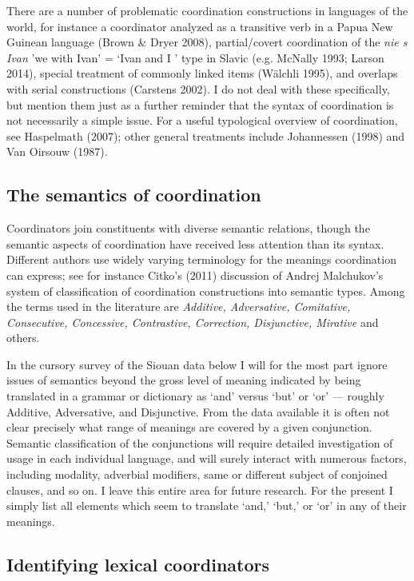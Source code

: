 \documentclass[output=paper]{LSP/langsci}
\begin{document}
There are a number of problematic coordination constructions in languages of the world, for instance a coordinator analyzed as a transitive verb in a Papua New Guinean language (Brown \& Dryer 2008),  partial/covert coordination of the \textit{nie s Ivan} 'we with Ivan' = `Ivan and I ' type in Slavic (e.g. McNally 1993; Larson 2014), special treatment of commonly linked items (W\"alchli 1995), and overlaps with serial constructions (Carstens 2002). I do not deal with these specifically, but mention them just as a further reminder that the syntax of coordination is not necessarily a simple issue. For a useful typological overview of coordination, see Haspelmath (2007); other general treatments include Johannessen (1998) and Van Oirsouw (1987). 

\subsection{The semantics of coordination}

Coordinators join constituents with diverse semantic relations, though the semantic aspects of coordination have received less attention than its syntax. Different authors use widely varying terminology for the meanings coordination can express; see for instance Citko's (2011) discussion of Andrej Malchukov's system of classification of coordination constructions into semantic types. Among the terms used in the literature are \textit{Additive, Adversative, Comitative, Consecutive, Concessive, Contrastive, Correction, Disjunctive, Mirative} and others.

In the cursory survey of the Siouan data below I will for the most part ignore issues of semantics beyond the gross level of meaning indicated by being translated in a grammar or dictionary as `and' versus `but' or `or' --- roughly Additive, Adversative, and Disjunctive. From the data available it is often not clear precisely what range of meanings are covered by a given conjunction. Semantic classification of the conjunctions will require detailed investigation of usage in each individual language, and will surely interact with numerous factors, including modality, adverbial modifiers, same or different subject of conjoined clauses, and so on. I leave this entire area for future research. For the present I simply list all elements which seem to translate `and,' `but,' or `or' in any of their meanings.

\subsection{Identifying lexical coordinators}
\end{document}

